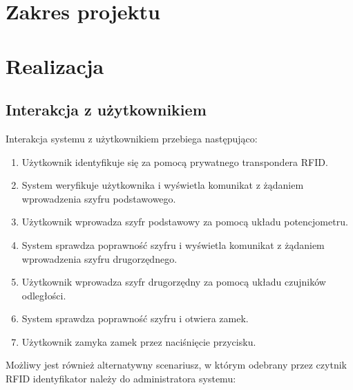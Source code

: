 \documentclass[polish,polish,a4paper]{article}
\begin{document}
	
	
	
	\section{Zakres projektu}
	
	\section{Realizacja}
	
	\subsection{Interakcja z użytkownikiem}
	\label{scenario}
	Interakcja systemu z użytkownikiem przebiega następująco:
	\begin{enumerate}
		\item Użytkownik identyfikuje się za pomocą prywatnego transpondera RFID.
		\item System weryfikuje użytkownika i wyświetla komunikat z żądaniem wprowadzenia szyfru podstawowego.
		\item Użytkownik wprowadza szyfr podstawowy za pomocą układu potencjometru.
		\item System sprawdza poprawność szyfru i wyświetla komunikat z żądaniem wprowadzenia szyfru drugorzędnego.
		\item Użytkownik wprowadza szyfr drugorzędny za pomocą układu czujników odległości.
		\item System sprawdza poprawność szyfru i otwiera zamek.
		\item Użytkownik zamyka zamek przez naciśnięcie przycisku.
	\end{enumerate}
	Możliwy jest również alternatywny scenariusz, w którym odebrany przez czytnik RFID identyfikator należy do administratora systemu:
\end{document}
